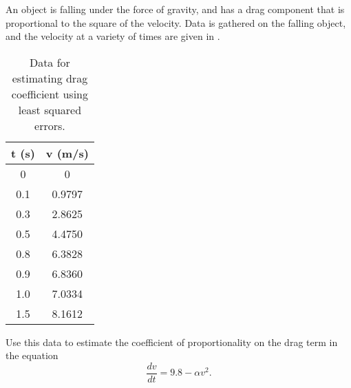 \begin{example}
An object is falling under the force of gravity, and has a drag component that is proportional to the square of the velocity. Data is gathered on the falling object, and the velocity at a variety of times are given in .

\begin{table}[h!!]
    \centering
    \begin{tabular}{|c|c|}\hline
         \textbf{t} (s)& \textbf{v} (m/s)  \\ \hline
        0 & 0 \\
        0.1 & 0.9797 \\
        0.3 & 2.8625 \\
        0.5 & 4.4750 \\
        0.8 & 6.3828 \\
        0.9 & 6.8360 \\
        1.0 & 7.0334 \\
        1.5 & 8.1612 \\ \hline
    \end{tabular}
    \caption{Data for estimating drag coefficient using least squared errors.} \label{estimData:table}
\end{table}

Use this data to estimate the coefficient of proportionality on the drag term in the equation 
\begin{equation*}
\frac{dv}{dt} = 9.8 - \alpha v^2.
\end{equation*}
\end{example}

